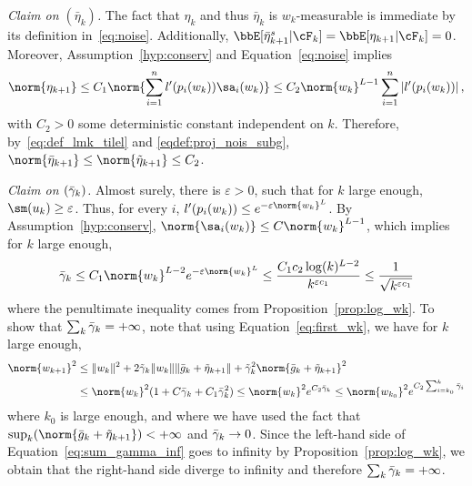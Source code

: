 \emph{Claim on $(\bar{\eta}_k)$.} The fact that $\eta_{k}$ and thus $\bar{\eta}_k$ is $w_k$-measurable is immediate by its definition in~\eqref{eq:noise}. Additionally, $\bbE[\bar{\eta}^s_{k+1} |\cF_k] = \bbE[\eta_{k+1} |\cF_k] = 0$. Moreover, Assumption~\ref{hyp:conserv} and Equation~\eqref{eq:noise} implies
\begin{equation*}
\norm{\eta_{k+1}} \leq C_1\norm{\sum_{i=1}^n l'(p_i(w_k))\sa_i(w_k)} \leq C_2 \norm{w_k}^{L-1} \sum_{i=1}^n |l'(p_i(w_k))|\, ,
\end{equation*}
with $C_2>0$ some deterministic constant independent on $k$. Therefore, by~\eqref{eq:def_lmk_tilel} and \eqref{eqdef:proj_nois_subg}, $\norm{\bar{\eta}_{k+1}} \leq \norm{\tilde{\eta}_{k+1}} \leq C_2$.

\emph{Claim on $(\bar{\gamma}_k)$.} Almost surely, there is $\varepsilon >0$, such that for $k$ large enough, $\sm(u_k) \geq  \varepsilon$. Thus, for every $i$, $l'(p_i(w_k)) \leq e^{-\varepsilon\norm{w_k}^L }$. By Assumption~\ref{hyp:conserv}, $\norm{\sa_i(w_k)} \leq C \norm{w_k}^{L-1}$, which implies for $k$ large enough,
\begin{equation*}
  \bgamma_k \leq C_1 \norm{w_k}^{L-2} e^{-\varepsilon \norm{w_k}^L} \leq \frac{C_1 c_2 \log(k)^{L-2}}{k^{\varepsilon c_1}} \leq \frac{1}{\sqrt{k^{\varepsilon c_1}}}
\end{equation*}
where the penultimate inequality comes from Proposition~\ref{prop:log_wk}.
To show that $\sum_{k} \bar{\gamma}_k = + \infty$, note that using Equation~\eqref{eq:first_wk}, we have for $k$ large enough,
\begin{equation}\label{eq:sum_gamma_inf}
  \begin{split}
\norm{w_{k+1}}^2  &\leq \lVert w_{k} \rVert^2 + 2 \tilde{\gamma}_k \lVert w_{k} \rVert \lVert \bg_k + \tilde{\eta}_{k+1} \rVert  + \tgamma_k^2 \norm{\bg_k + \tilde{\eta}_{k+1}}^2\\
&\leq \norm{w_k}^2 (1 + C \bgamma_k + C_1 \bgamma_k^2) \leq \norm{w_k}^2 e^{C_2 \bgamma_k} \leq \norm{w_{k_0}}^2 e^{C_2 \sum_{i=k_0}^{k} \bgamma_i }
\end{split}
\end{equation}
where $k_0$ is large enough, and where we have used the fact that $\sup_{k} (\norm{\bg_k + \tilde{\eta}_{k+1}}) < + \infty$ and $\bar{\gamma}_k \rightarrow 0$. 
Since the left-hand side of Equation~\eqref{eq:sum_gamma_inf} goes to infinity by Proposition~\ref{prop:log_wk}, we obtain that the right-hand side diverge to infinity and therefore $\sum_{k } \bar{\gamma}_k = + \infty$.


